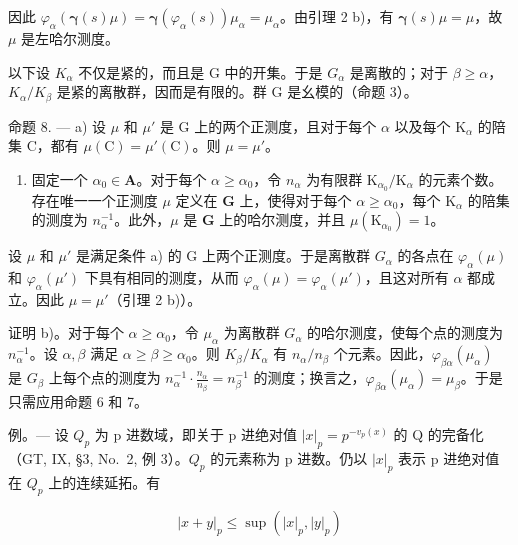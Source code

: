 因此 \(\varphi_{\alpha}(\pmb{\gamma}(s)\mu) = \pmb{\gamma}(\varphi_{\alpha}(s))\mu_{\alpha} = \mu_{\alpha}\)。由引理 2 b)，有 \(\pmb{\gamma}(s)\mu = \mu\)，故 \(\mu\) 是左哈尔测度。

以下设 \(K_{\alpha}\) 不仅是紧的，而且是 G 中的开集。于是 \(G_{\alpha}\) 是离散的；对于 \(\beta \geqslant \alpha\)，\(K_{\alpha}/K_{\beta}\) 是紧的离散群，因而是有限的。群 G 是幺模的（命题 3）。

命题 8. --- a) 设 \(\mu\) 和 \(\mu'\) 是 G 上的两个正测度，且对于每个 \(\alpha\) 以及每个 \(\mathrm{K}_{\alpha}\) 的陪集 C，都有 \(\mu(\mathrm{C}) = \mu'(\mathrm{C})\)。则 \(\mu = \mu'\)。

\begin{enumerate}
\def\labelenumi{\alph{enumi})}
\setcounter{enumi}{1}
\tightlist
\item
  固定一个 \(\alpha_0 \in \mathbf{A}\)。对于每个 \(\alpha \geqslant \alpha_0\)，令 \(n_{\alpha}\) 为有限群 \(\mathrm{K}_{\alpha_0} / \mathrm{K}_{\alpha}\) 的元素个数。存在唯一一个正测度 \(\mu\) 定义在 \(\mathbf{G}\) 上，使得对于每个 \(\alpha \geqslant \alpha_0\)，每个 \(\mathrm{K}_{\alpha}\) 的陪集的测度为 \(n_{\alpha}^{-1}\)。此外，\(\mu\) 是 \(\mathbf{G}\) 上的哈尔测度，并且 \(\mu(\mathrm{K}_{\alpha_0}) = 1\)。
\end{enumerate}

设 \(\mu\) 和 \(\mu'\) 是满足条件 a) 的 G 上两个正测度。于是离散群 \(G_{\alpha}\) 的各点在 \(\varphi_{\alpha}(\mu)\) 和 \(\varphi_{\alpha}(\mu')\) 下具有相同的测度，从而 \(\varphi_{\alpha}(\mu) = \varphi_{\alpha}(\mu')\)，且这对所有 \(\alpha\) 都成立。因此 \(\mu = \mu'\)（引理 2 b)）。

证明 b)。对于每个 \(\alpha \geqslant \alpha_0\)，令 \(\mu_{\alpha}\) 为离散群 \(G_{\alpha}\) 的哈尔测度，使每个点的测度为 \(n_{\alpha}^{-1}\)。设 \(\alpha, \beta\) 满足 \(\alpha \geqslant \beta \geqslant \alpha_0\)。则 \(K_{\beta}/K_{\alpha}\) 有 \(n_{\alpha}/n_{\beta}\) 个元素。因此，\(\varphi_{\beta\alpha}(\mu_{\alpha})\) 是 \(G_{\beta}\) 上每个点的测度为 \(n_{\alpha}^{-1} \cdot \frac{n_{\alpha}}{n_{\beta}} = n_{\beta}^{-1}\) 的测度；换言之，\(\varphi_{\beta\alpha}(\mu_{\alpha}) = \mu_{\beta}\)。于是只需应用命题 6 和 7。

例。--- 设 \(Q_{p}\) 为 p 进数域，即关于 p 进绝对值 \(|x|_{p} = p^{-v_{p}(x)}\) 的 Q 的完备化（GT, IX, §3, No.~2, 例 3）。\(Q_{p}\) 的元素称为 p 进数。仍以 \(|x|_{p}\) 表示 p 进绝对值在 \(Q_{p}\) 上的连续延拓。有

\[
| x + y | _ {p} \leqslant \sup (| x | _ {p}, | y | _ {p})
\]

